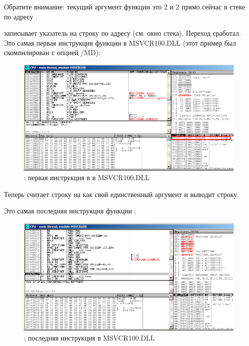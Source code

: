 Обратите внимание: текущий аргумент функции это 2 и 2 прямо сейчас в стеке по адресу .

\clearpage
\MOV записывает указатель на строку по адресу  (см. окно стека).
Переход сработал.
Это самая первая инструкция функции \printf в MSVCR100.DLL (этот пример был скомпилирован с опцией /MD): 

\begin{figure}[H]
\centering
\includegraphics[scale=\FigScale]{patterns/08_switch/1_few/olly6.png}
\caption{\olly: первая инструкция в \printf в MSVCR100.DLL}
\label{fig:switch_few_olly6}
\end{figure}

Теперь \printf считает строку на  как свой единственный аргумент и выводит строку.

\clearpage
Это самая последняя инструкция функции \printf:

\begin{figure}[H]
\centering
\includegraphics[scale=\FigScale]{patterns/08_switch/1_few/olly7.png}
\caption{\olly: последняя инструкция в \printf \InENRU MSVCR100.DLL}
\label{fig:switch_few_olly7}
\end{figure}

